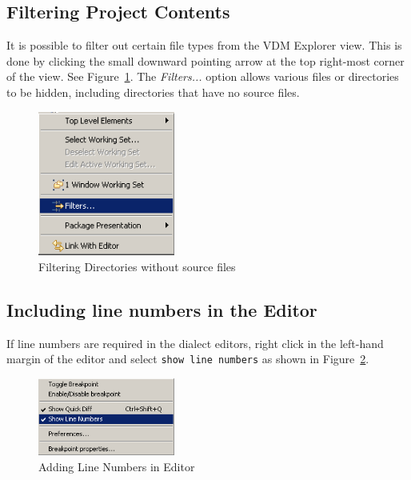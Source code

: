 \documentclass{overturerepchap}
\begin{document}
\subsection{Filtering Project Contents}

It is possible to filter out certain file types from the VDM Explorer view.
This is done by clicking the small downward pointing arrow at the top
right-most corner of the view. See
Figure~\ref{fig:filteringfiles}. The \emph{Filters...} option allows
various files or directories to be hidden, including
directories that have no source files.

\begin{figure}[!htb]
\begin{center}
\includegraphics[width=0.4\textwidth]{screenDumps/filteringfiles}
\caption{Filtering Directories without source files\label{fig:filteringfiles}}
\end{center}
\end{figure}

\subsection{Including line numbers in the Editor}

If line numbers are required in the dialect
editors, right click in the left-hand margin
of the editor and select \texttt{show line numbers} as shown in
Figure~\ref{fig:linenumbers}. 

\begin{figure}[!htb]
\begin{center}
\includegraphics[width=0.4\textwidth]{screenDumps/linenumbers}
\caption{Adding Line Numbers in Editor\label{fig:linenumbers}}
\end{center}
\end{figure}
\end{document}
